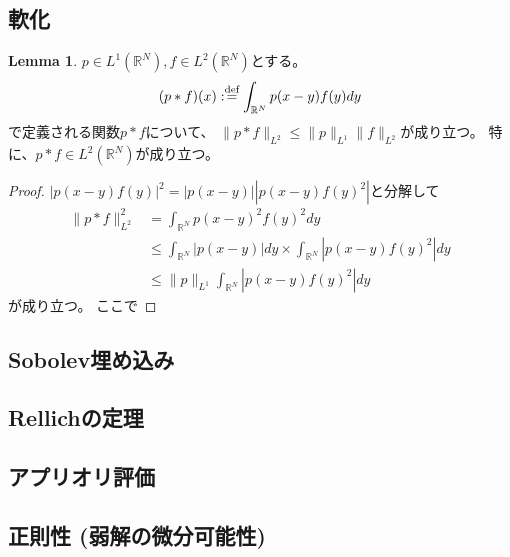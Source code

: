 \documentclass[uplatex]{jsarticle}
\theoremstyle{definition}
\newtheorem{lem}[lem]{Lemma}
\newcommand{\dfn}{:\overset{\mbox{{\scriptsize def}}}{=}}
\newcommand{\R}{\mathbb{R}}
\begin{document}
\subsection{軟化}


\begin{lem}
  \(p\in L^1(\R^N), f\in L^2(\R^N)\)とする。
  \[
  (p*f)(x) \dfn \int_{\R^N}p(x-y)f(y)dy
  \]
  で定義される関数\(p*f\)について、
  \(\|p*f\|_{L^2} \leq \|p\|_{L^1}\|f\|_{L^2}\)が成り立つ。
  特に、\(p*f\in L^2(\R^N)\)が成り立つ。
\end{lem}

\begin{proof}
  \(|p(x-y)f(y)|^2 = |p(x-y)||p(x-y)f(y)^2|\)と分解して
  \begin{align*}
    \|p*f\|_{L^2}^2
    &= \int_{\R^N}p(x-y)^2f(y)^2dy \\
    &\leq \int_{\R^N}|p(x-y)|dy \times \int_{\R^N}|p(x-y)f(y)^2|dy \\
    &\leq \|p\|_{L^1} \int_{\R^N}|p(x-y)f(y)^2|dy
  \end{align*}
  が成り立つ。
  ここで
\end{proof}






\subsection{Sobolev埋め込み}


\subsection{Rellichの定理}


\subsection{アプリオリ評価}

\subsection{正則性 (弱解の微分可能性)}



















\appendix
\end{document}
